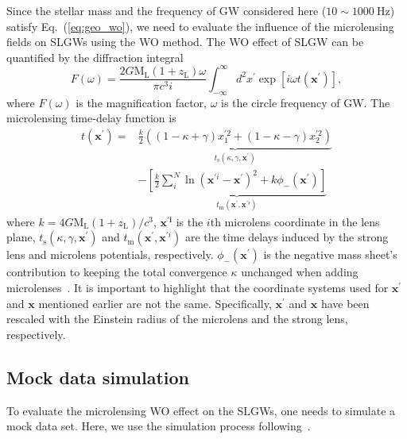 \documentclass[fleqn,usenatbib]{mnras}
\begin{document}
Since the stellar mass and the frequency of GW considered here ($10\sim1000~\mathrm{Hz}$) satisfy Eq.~(\ref{eq:geo_wo}), we need to evaluate the influence of the microlensing fields on SLGWs using the WO method.
The WO effect of SLGW can be quantified by the diffraction integral~\citep{schneider1992gravitational,10.1143/PTPS.133.137,Takahashi:2003ix}
\begin{equation}
\label{eq:DiffInter}
F(\omega)=\frac{2 G \mathrm{M}_\mathrm{L}\left(1+z_\mathrm{L}\right) \omega}{\pi c^{3} i} \int_{-\infty}^{\infty} d^{2} x^\prime \exp \left[i \omega t(\boldsymbol{x^\prime})\right] ,
\end{equation}
where $F(\omega)$ is the magnification factor, $\omega$ is the circle frequency of GW.
The microlensing time-delay function is
\begin{equation}
\begin{split}
\label{eq:TimeDelay}
t(\boldsymbol{x^\prime}) = &\underbrace{\frac{k}{2}\left((1-\kappa+\gamma) x_{1}^{\prime 2}+(1-\kappa-\gamma) x_{2}^{\prime 2}\right)}_{t_\text{s}(\kappa,\gamma,\boldsymbol{x}^\prime)} \\ 
& - \underbrace{\left[\frac{k}{2}\sum_{i}^{N} \ln \left(\boldsymbol{x}^{\prime i}-\boldsymbol{x^\prime}\right)^{2} + k\phi_{-}(\boldsymbol{x^\prime})\right]}_{t_\text{m}(\boldsymbol{x^\prime},\boldsymbol{x}^{\prime i})}
\end{split}
\end{equation}
where $k=4 G \text{M}_\mathrm{L}(1+z_\mathrm{L})/c^3$, $\boldsymbol{x^{\prime i}}$ is the $i$th microlens coordinate in the lens plane, $t_\text{s}(\kappa,\gamma,\boldsymbol{x}^\prime)$ and $t_\text{m}(\boldsymbol{x^\prime},\boldsymbol{x}^{\prime i})$ are the time delays induced by the strong lens and microlens potentials, respectively.
$\phi_{-}(\boldsymbol{x^\prime})$ is the negative mass sheet's contribution to keeping the total convergence $\kappa$ unchanged when adding microlenses~\citep{Wambsganss1990, 2021xuechunchen, Zheng:2022vfq}.
It is important to highlight that the coordinate systems used for $\boldsymbol{x^\prime}$ and $\boldsymbol{x}$ mentioned earlier are not the same.
Specifically, $\boldsymbol{x^\prime}$ and $\boldsymbol{x}$ have been rescaled with the Einstein radius of the microlens and the strong lens, respectively.

\subsection{Mock data simulation}
\label{sec:moc_dat}
To evaluate the microlensing WO effect on the SLGWs, one needs to simulate a mock data set.
Here, we use the simulation process following~\cite{Haris:2018vmn,Xu:2021bfn,Shan:2023ngi}.
\end{document}

